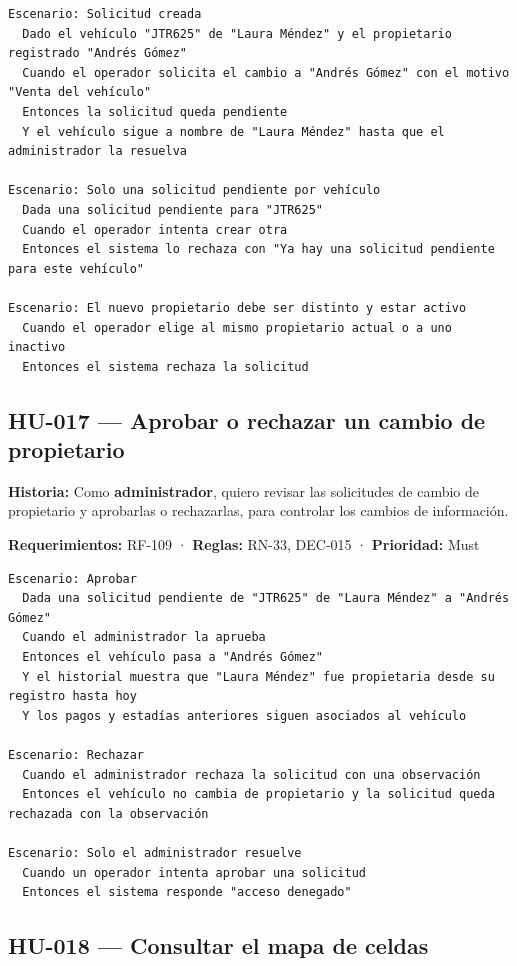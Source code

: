 \begin{lstlisting}[style=gherkin]
Escenario: Solicitud creada
  Dado el vehículo "JTR625" de "Laura Méndez" y el propietario registrado "Andrés Gómez"
  Cuando el operador solicita el cambio a "Andrés Gómez" con el motivo "Venta del vehículo"
  Entonces la solicitud queda pendiente
  Y el vehículo sigue a nombre de "Laura Méndez" hasta que el administrador la resuelva

Escenario: Solo una solicitud pendiente por vehículo
  Dada una solicitud pendiente para "JTR625"
  Cuando el operador intenta crear otra
  Entonces el sistema lo rechaza con "Ya hay una solicitud pendiente para este vehículo"

Escenario: El nuevo propietario debe ser distinto y estar activo
  Cuando el operador elige al mismo propietario actual o a uno inactivo
  Entonces el sistema rechaza la solicitud
\end{lstlisting}

\subsection{HU-017 — Aprobar o rechazar un cambio de propietario}

\textbf{Historia:} Como \textbf{administrador}, quiero revisar las solicitudes de cambio de propietario y aprobarlas o rechazarlas, para controlar los cambios de información.


\textbf{Requerimientos:} RF-109 · \textbf{Reglas:} RN-33, DEC-015 · \textbf{Prioridad:} Must


\begin{lstlisting}[style=gherkin]
Escenario: Aprobar
  Dada una solicitud pendiente de "JTR625" de "Laura Méndez" a "Andrés Gómez"
  Cuando el administrador la aprueba
  Entonces el vehículo pasa a "Andrés Gómez"
  Y el historial muestra que "Laura Méndez" fue propietaria desde su registro hasta hoy
  Y los pagos y estadías anteriores siguen asociados al vehículo

Escenario: Rechazar
  Cuando el administrador rechaza la solicitud con una observación
  Entonces el vehículo no cambia de propietario y la solicitud queda rechazada con la observación

Escenario: Solo el administrador resuelve
  Cuando un operador intenta aprobar una solicitud
  Entonces el sistema responde "acceso denegado"
\end{lstlisting}

\subsection{HU-018 — Consultar el mapa de celdas}

